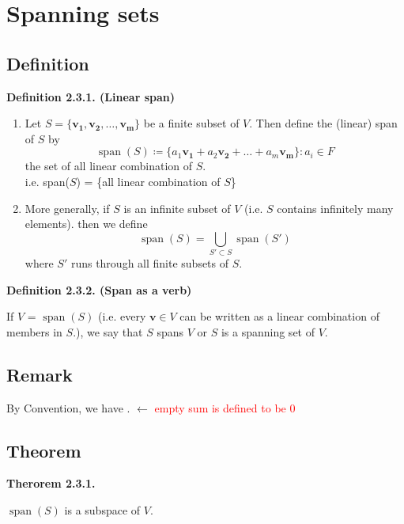 \documentclass[12pt]{article}
\begin{document}
\section{Spanning sets}

\subsection{Definition}

\textbf{Definition 2.3.1. (Linear span)}

\begin{enumerate}
    \item Let $S = \{\mathbf{v_1}, \mathbf{v_2}, \ldots, \mathbf{v_m}\}$ be a finite subset of $V$. Then define the (linear) span of $S$ by
    \[
        \operatorname{span}(S) \coloneq \{a_1\mathbf{v_1} + a_2\mathbf{v_2} + \ldots + a_m\mathbf{v_m}\} : a_i \in F
    \]
    the set of all linear combination of $S$.\\
    i.e. span($S$) = \{all linear combination of $S$\}
    \item More generally, if $S$ is an infinite subset of $V$ (i.e. $S$ contains infinitely many elements). then we define
    \[
        \operatorname{span}(S)
        =
        \bigcup_{S'\subset S} \operatorname{span}(S')    
    \]
    where $S'$ runs through all finite subsets of $S$.
\end{enumerate}

\textbf{Definition 2.3.2. (Span as a verb)}

If $V$ = $\operatorname{span}(S)$ (i.e. every $\mathbf{v} \in V$ can be written as a linear combination
of members in $S$.), we say that $S$ spans $V$ or $S$ is a spanning set of $V$.

\subsection{Remark}

By Convention, we have 
.
\qquad
$\leftarrow$
\textcolor{red}{empty sum is defined to be $0$}

\subsection{Theorem}
\textbf{Therorem 2.3.1.}

$\operatorname{span}(S)$ is a subspace of $V$.
\end{document}
